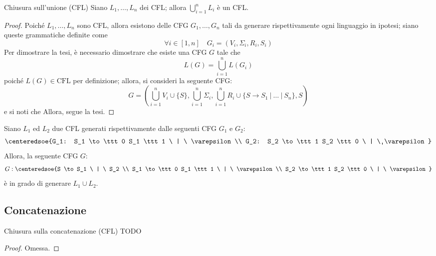 \documentclass[a4paper, 12pt]{report}
\begin{document}
    \begin{framedprop}{Chiusura sull'unione (CFL)}
        Siano $L_1, \ldots, L_n$ dei CFL; allora $\displaystyle \bigcup_{i =1}^n{L_i}$ è un CFL.
    \end{framedprop}

    \begin{proof}
        Poiché $L_1, \ldots, L_n$ sono CFL, allora esistono delle CFG $G_1, \ldots, G_n$ tali da generare rispettivamente ogni linguaggio in ipotesi; siano queste grammatiche definite come $$\forall i \in [1, n] \quad G_i = (V_i, \Sigma_i, R_i, S_i)$$ Per dimostrare la tesi, è necessario dimostrare che esiste una CFG $G$ tale che $$L(G) = \bigcup_{i = 1}^n{L(G_i)}$$ poiché $L(G)\in \mathrm{CFL}$ per definizione; allora, si consideri la seguente CFG: $$\displaystyle G = \left( \bigcup_{i = 1}^n{V_i} \cup \{S\}, \bigcup_{i = 1}^n{\Sigma_i}, \bigcup_{i = 1}^n{R_i} \cup \{S \rightarrow S_1 \ | \ \ldots \ | \ S_n\}, S \right)$$ e si noti che  Allora, segue la tesi.
    \end{proof}

    \begin{example}
        Siano $L_1$ ed $L_2$ due CFL generati rispettivamente dalle seguenti CFG $G_1$ e $G_2$: $$\centeredsoe{G_1: S_1 \to \ttt 0 S_1 \ttt 1 \ | \ \varepsilon \\ G_2: S_2 \to \ttt 1 S_2 \ttt 0 \ | \ \varepsilon}$$ Allora, la seguente CFG $G$: $$G: \centeredsoe{S \to S_1 \ | \ S_2 \\ S_1 \to \ttt 0 S_1 \ttt 1 \ | \ \varepsilon \\ S_2 \to \ttt 1 S_2 \ttt 0 \ | \ \varepsilon }$$ è in grado di generare $L_1 \cup L_2$.
    \end{example}

    \subsection{Concatenazione}

    \begin{framedprop}{Chiusura sulla concatenazione (CFL)}
        TODO
    \end{framedprop}

    \begin{proof}
        Omessa.
    \end{proof}
\end{document}
